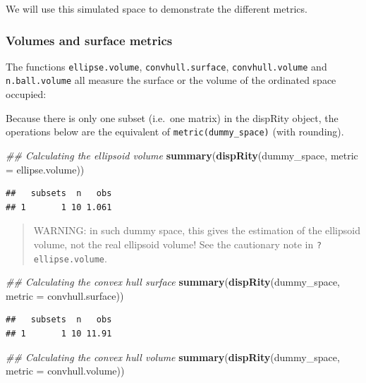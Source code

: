 \documentclass[]{book}
\newenvironment{Shaded}{\begin{snugshade}}{\end{snugshade}}
\newcommand{\CommentTok}[1]{\textcolor[rgb]{0.56,0.35,0.01}{\textit{#1}}}
\newcommand{\DataTypeTok}[1]{\textcolor[rgb]{0.13,0.29,0.53}{#1}}
\newcommand{\KeywordTok}[1]{\textcolor[rgb]{0.13,0.29,0.53}{\textbf{#1}}}
\newcommand{\NormalTok}[1]{#1}
\begin{document}
We will use this simulated space to demonstrate the different metrics.

\hypertarget{volumes-and-surface-metrics}{%
\subsubsection{Volumes and surface metrics}\label{volumes-and-surface-metrics}}

The functions \texttt{ellipse.volume}, \texttt{convhull.surface}, \texttt{convhull.volume} and \texttt{n.ball.volume} all measure the surface or the volume of the ordinated space occupied:

Because there is only one subset (i.e.~one matrix) in the dispRity object, the operations below are the equivalent of \texttt{metric(dummy\_space)} (with rounding).

\begin{Shaded}
\begin{Highlighting}[]
\CommentTok{## Calculating the ellipsoid volume}
\KeywordTok{summary}\NormalTok{(}\KeywordTok{dispRity}\NormalTok{(dummy_space, }\DataTypeTok{metric =}\NormalTok{ ellipse.volume))}
\end{Highlighting}
\end{Shaded}

\begin{verbatim}
##   subsets  n   obs
## 1       1 10 1.061
\end{verbatim}

\begin{quote}
WARNING: in such dummy space, this gives the estimation of the ellipsoid volume, not the real ellipsoid volume! See the cautionary note in \texttt{?ellipse.volume}.
\end{quote}

\begin{Shaded}
\begin{Highlighting}[]
\CommentTok{## Calculating the convex hull surface}
\KeywordTok{summary}\NormalTok{(}\KeywordTok{dispRity}\NormalTok{(dummy_space, }\DataTypeTok{metric =}\NormalTok{ convhull.surface))}
\end{Highlighting}
\end{Shaded}

\begin{verbatim}
##   subsets  n   obs
## 1       1 10 11.91
\end{verbatim}

\begin{Shaded}
\begin{Highlighting}[]
\CommentTok{## Calculating the convex hull volume}
\KeywordTok{summary}\NormalTok{(}\KeywordTok{dispRity}\NormalTok{(dummy_space, }\DataTypeTok{metric =}\NormalTok{ convhull.volume))}
\end{Highlighting}
\end{Shaded}
\end{document}
